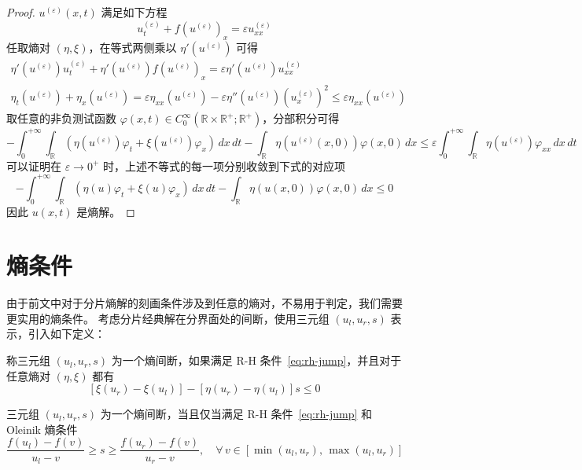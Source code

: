 \begin{proof}
    $u^{(\varepsilon)}(x,t)$ 满足如下方程
    \[
        u^{(\varepsilon)}_t + f(u^{(\varepsilon)})_x = \varepsilon u^{(\varepsilon)}_{xx}
    \]
    任取熵对 $(\eta,\xi)$，在等式两侧乘以 $\eta'(u^{(\varepsilon)})$ 可得
    \begin{gather*}
        \eta'(u^{(\varepsilon)}) u^{(\varepsilon)}_t + \eta'(u^{(\varepsilon)})f(u^{(\varepsilon)})_x = \varepsilon \eta'(u^{(\varepsilon)}) u^{(\varepsilon)}_{xx}  \\
        \eta_t(u^{(\varepsilon)}) + \eta_x(u^{(\varepsilon)}) =
        \varepsilon \eta_{xx}(u^{(\varepsilon)})
        - \varepsilon \eta''(u^{(\varepsilon)})(u^{(\varepsilon)}_{x})^2
        \le \varepsilon \eta_{xx}(u^{(\varepsilon)})
    \end{gather*}
    取任意的非负测试函数 $\varphi(x,t) \in C_0^\infty(\mathbb{R} \times \mathbb{R}^+;\mathbb{R}^+)$，分部积分可得
    \[
        - \int_0^{+\infty} \int_{\mathbb{R}}(\eta(u^{(\varepsilon)}) \varphi_t + \xi(u^{(\varepsilon)}) \varphi_x) \,dx\,dt
        - \int_{\mathbb{R}} \eta(u^{(\varepsilon)}(x,0))\varphi(x,0)\,dx \le \varepsilon \int_0^{+\infty} \int_{\mathbb{R}}
        \eta(u^{(\varepsilon)}) \varphi_{xx}\,dx\,dt
    \]
    可以证明在 $\varepsilon \to 0^+$ 时，上述不等式的每一项分别收敛到下式的对应项
    \[
        - \int_0^{+\infty} \int_{\mathbb{R}}(\eta(u) \varphi_t + \xi(u) \varphi_x) \,dx\,dt
        - \int_{\mathbb{R}} \eta(u(x,0))\varphi(x,0)\,dx \le 0
    \]
    因此 $u(x,t)$ 是熵解。
\end{proof}


\section{熵条件}

由于前文中对于分片熵解的刻画条件涉及到任意的熵对，不易用于判定，我们需要更实用的熵条件。
考虑分片经典解在分界面处的间断，使用三元组 $(u_l,u_r,s)$ 表示，引入如下定义：

\begin{definition}
    称三元组 $(u_l,u_r,s)$ 为一个熵间断，如果满足 R-H 条件~\eqref{eq:rh-jump}，并且对于任意熵对 $(\eta,\xi)$ 都有
    \[
        \left[\xi(u_r) - \xi(u_l)\right] - \left[\eta(u_r) - \eta(u_l)\right] s \le 0
    \]
\end{definition}

\begin{theorem}[Oleinik]
    三元组 $(u_l,u_r,s)$ 为一个熵间断，当且仅当满足 R-H 条件~\eqref{eq:rh-jump} 和 Oleinik 熵条件
    \[
        \frac{f(u_l)-f(v)}{u_l-v} \ge s \ge \frac{f(u_r)-f(v)}{u_r-v},
        \quad \forall\,v \in [\min(u_l, u_r),\,\max(u_l, u_r)]
    \]
\end{theorem}

